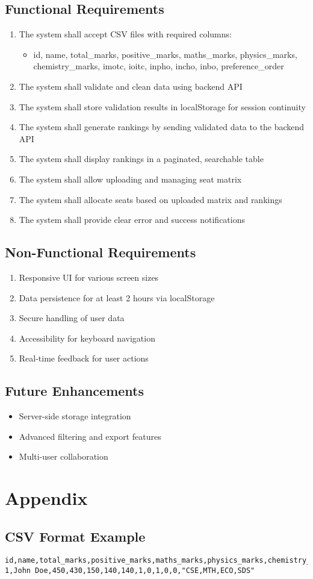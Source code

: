 \documentclass[12pt,a4paper]{article}
\begin{document}
\subsection{Functional Requirements}
\begin{enumerate}[label=FR\arabic*.]
    \item The system shall accept CSV files with required columns:
    \begin{itemize}
        \item id, name, total_marks, positive_marks, maths_marks, physics_marks, chemistry_marks, imotc, ioitc, inpho, incho, inbo, preference_order
    \end{itemize}
    \item The system shall validate and clean data using backend API
    \item The system shall store validation results in localStorage for session continuity
    \item The system shall generate rankings by sending validated data to the backend API
    \item The system shall display rankings in a paginated, searchable table
    \item The system shall allow uploading and managing seat matrix
    \item The system shall allocate seats based on uploaded matrix and rankings
    \item The system shall provide clear error and success notifications
\end{enumerate}

\subsection{Non-Functional Requirements}
\begin{enumerate}[label=NFR\arabic*.]
    \item Responsive UI for various screen sizes
    \item Data persistence for at least 2 hours via localStorage
    \item Secure handling of user data
    \item Accessibility for keyboard navigation
    \item Real-time feedback for user actions
\end{enumerate}

\subsection{Future Enhancements}
\begin{itemize}
    \item Server-side storage integration
    \item Advanced filtering and export features
    \item Multi-user collaboration
\end{itemize}

\section{Appendix}
\subsection{CSV Format Example}
\begin{lstlisting}
id,name,total_marks,positive_marks,maths_marks,physics_marks,chemistry_marks,imotc,ioitc,inpho,incho,inbo,preference_order
1,John Doe,450,430,150,140,140,1,0,1,0,0,"CSE,MTH,ECO,SDS"
\end{lstlisting}
\end{document}
